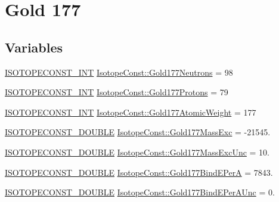 \hypertarget{group___isotope_const-_gold-_au177}{}\section{Gold 177}
\label{group___isotope_const-_gold-_au177}
\subsection*{Variables}
\begin{DoxyCompactItemize}
\item 
\mbox{\hyperlink{group___isotope_const-_macros_ga5f18360b3e99483a35c32d789e62621c}{I\+S\+O\+T\+O\+P\+E\+C\+O\+N\+S\+T\+\_\+\+I\+NT}} \mbox{\hyperlink{group___isotope_const-_gold-_au177_gaee3c527aad7eccd3d865cb827c6d84b0}{Isotope\+Const\+::\+Gold177\+Neutrons}} = 98
\item 
\mbox{\hyperlink{group___isotope_const-_macros_ga5f18360b3e99483a35c32d789e62621c}{I\+S\+O\+T\+O\+P\+E\+C\+O\+N\+S\+T\+\_\+\+I\+NT}} \mbox{\hyperlink{group___isotope_const-_gold-_au177_gaa0a85563deac1ad6dfc3e954982441c4}{Isotope\+Const\+::\+Gold177\+Protons}} = 79
\item 
\mbox{\hyperlink{group___isotope_const-_macros_ga5f18360b3e99483a35c32d789e62621c}{I\+S\+O\+T\+O\+P\+E\+C\+O\+N\+S\+T\+\_\+\+I\+NT}} \mbox{\hyperlink{group___isotope_const-_gold-_au177_gafacd639aafcd55c4f0cf9a89781fdc70}{Isotope\+Const\+::\+Gold177\+Atomic\+Weight}} = 177
\item 
\mbox{\hyperlink{group___isotope_const-_macros_ga8f45a7272ce02c0b4c65c44636ed719a}{I\+S\+O\+T\+O\+P\+E\+C\+O\+N\+S\+T\+\_\+\+D\+O\+U\+B\+LE}} \mbox{\hyperlink{group___isotope_const-_gold-_au177_ga9494462520d27415b485d4fdea77548c}{Isotope\+Const\+::\+Gold177\+Mass\+Exc}} = -\/21545.
\item 
\mbox{\hyperlink{group___isotope_const-_macros_ga8f45a7272ce02c0b4c65c44636ed719a}{I\+S\+O\+T\+O\+P\+E\+C\+O\+N\+S\+T\+\_\+\+D\+O\+U\+B\+LE}} \mbox{\hyperlink{group___isotope_const-_gold-_au177_ga54b15e07d59f825f51b955b1795c59aa}{Isotope\+Const\+::\+Gold177\+Mass\+Exc\+Unc}} = 10.
\item 
\mbox{\hyperlink{group___isotope_const-_macros_ga8f45a7272ce02c0b4c65c44636ed719a}{I\+S\+O\+T\+O\+P\+E\+C\+O\+N\+S\+T\+\_\+\+D\+O\+U\+B\+LE}} \mbox{\hyperlink{group___isotope_const-_gold-_au177_ga1e013a953dab3d0cf29db60efc38498d}{Isotope\+Const\+::\+Gold177\+Bind\+E\+PerA}} = 7843.
\item 
\mbox{\hyperlink{group___isotope_const-_macros_ga8f45a7272ce02c0b4c65c44636ed719a}{I\+S\+O\+T\+O\+P\+E\+C\+O\+N\+S\+T\+\_\+\+D\+O\+U\+B\+LE}} \mbox{\hyperlink{group___isotope_const-_gold-_au177_ga4c695f07dcdbd1962b35d97b2513ffb0}{Isotope\+Const\+::\+Gold177\+Bind\+E\+Per\+A\+Unc}} = 0.

\end{DoxyCompactItemize}
